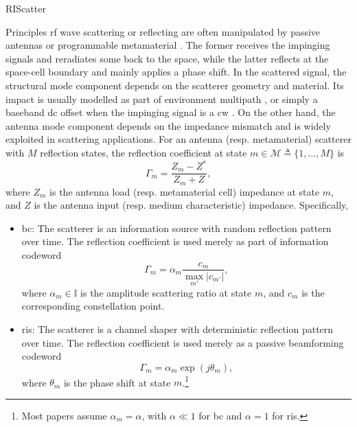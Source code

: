\begin{section}{RIScatter}
	\label{sc:riscatter}
	\begin{subsection}{Principles}
		\label{sc:principles}
		\gls{rf} wave scattering or reflecting are often manipulated by passive antennas or programmable metamaterial \cite{Liang2022}.
		The former receives the impinging signals and reradiates some back to the space, while the latter reflects at the space-cell boundary and mainly applies a phase shift.
		In the scattered signal, the structural mode component depends on the scatterer geometry and material.
		Its impact is usually modelled as part of environment multipath \cite{Thomas2012,Liang2020}, or simply a baseband \gls{dc} offset when the impinging signal is a \gls{cw} \cite{Boyer2014}.
		On the other hand, the antenna mode component depends on the impedance mismatch and is widely exploited in scattering applications.
		For an antenna (resp. metamaterial) scatterer with $M$ reflection states, the reflection coefficient at state $m \in \mathcal{M} \triangleq \{1,\ldots,M\}$ is \cite{VanHuynh2017,Liang2022}
		\begin{equation}
			\Gamma_m = \frac{Z_m - Z^*}{Z_m + Z},
			\label{eq:reflection_coefficient}
		\end{equation}
		where $Z_m$ is the antenna load (resp. metamaterial cell) impedance at state $m$, and $Z$ is the antenna input (resp. medium characteristic) impedance.
		Specifically,
		\begin{itemize}
			\item \gls{bc}: The scatterer is an information source with random reflection pattern over time.
			The reflection coefficient is used merely as part of information codeword \cite{Thomas2012a}
			\begin{equation}
				\Gamma_m = \alpha_m \frac{c_m}{\max_{m'} \lvert c_{m'} \rvert},
				\label{eq:backscatter_modulation}
			\end{equation}
			where $\alpha_m \in \mathbb{I}$ is the amplitude scattering ratio at state $m$, and $c_m$ is the corresponding constellation point.
			\item \gls{ris}: The scatterer is a channel shaper with deterministic reflection pattern over time.
			The reflection coefficient is used merely as a passive beamforming codeword \cite{Wu2018}
			\begin{equation}
				\Gamma_m = \alpha_m \exp(j \theta_m),
				\label{eq:passive_beamforming}
			\end{equation}
			where $\theta_m$ is the phase shift at state $m$.\footnote{Most papers assume $\alpha_m = \alpha$, with $\alpha \ll 1$ for \gls{bc} and $\alpha=1$ for \gls{ris}.\label{fn:scattering_ratio}}
		\end{itemize}


\end{subsection}
\end{section}
